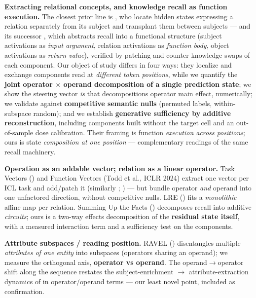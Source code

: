\textbf{Extracting relational concepts, and knowledge recall as function
execution.} The closest prior line is \citet{wang2024locating}, who locate
hidden states expressing a relation separately from its subject and
transplant them between subjects --- and its successor \textbf{\citet{wang2025functional}}, which abstracts recall into a functional structure (subject
activations as \emph{input argument}, relation activations as
\emph{function body}, object activations as \emph{return value}),
verified by patching and counter-knowledge swaps of each component. Our
object of study differs in four ways: they localize and exchange
components read at \emph{different token positions}, while we quantify
the \textbf{joint operator \ensuremath{\times} operand decomposition of a single
prediction state}; we show the steering vector \emph{is} that
decomposition\textquotesingle s operator main effect, numerically; we
validate against \textbf{competitive semantic nulls} (permuted labels,
within-subspace random); and we establish \textbf{generative sufficiency
by additive reconstruction}, including components built without the
target cell and an out-of-sample dose calibration. Their framing is
function \emph{execution across positions}; ours is state
\emph{composition at one position} --- complementary readings of the
same recall machinery.

\textbf{Operation as an addable vector; relation as a linear operator.}
Task Vectors (\citealp{hendel2023icl}) and Function Vectors (Todd et
al., ICLR 2024) extract one vector per ICL task and add/patch it
(similarly \citealp{liu2024icv}; \citealp{turner2023actadd}) --- but bundle
operator \emph{and} operand into one unfactored direction, without
competitive nulls. LRE (\citealp{hernandez2024lre}) fits a
\emph{monolithic} affine map per relation. Summing Up the Facts
(\citealp{chughtai2024summing}) decomposes recall into additive \emph{circuits};
ours is a two-way effects decomposition of the \textbf{residual state
itself}, with a measured interaction term and a sufficiency test on the
components.

\textbf{Attribute subspaces / reading position.} RAVEL (\citealp{huang2024ravel}) disentangles multiple \emph{attributes of one entity} into
subspaces (operators sharing an operand); we measure the orthogonal
axis, \textbf{operator vs operand}. The operand\ensuremath{\to}operator shift along the
sequence restates the subject-enrichment \ensuremath{\to} attribute-extraction dynamics
of \citet{geva2023dissecting} in operator/operand terms --- our least
novel point, included as confirmation.

